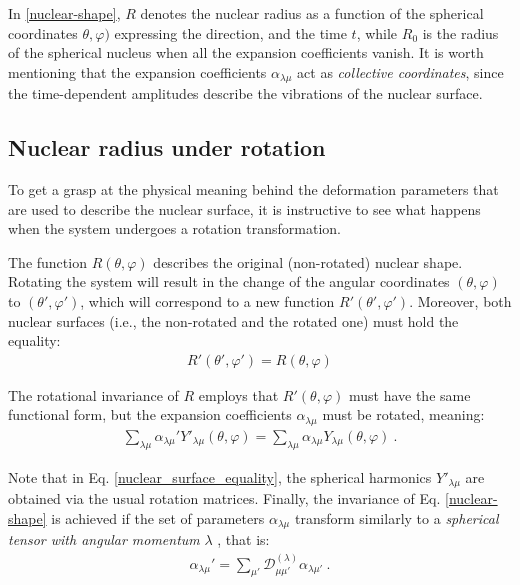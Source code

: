 In \ref{nuclear-shape}, $R$ denotes the nuclear radius as a function of the spherical coordinates $\theta,\varphi)$ expressing the direction, and the time $t$, while $R_0$ is the radius of the spherical nucleus when all the expansion coefficients vanish. It is worth mentioning that the expansion coefficients $\alpha_{\lambda\mu}$ act as \emph{collective coordinates}, since the time-dependent amplitudes describe the vibrations of the nuclear surface.

\subsection{Nuclear radius under rotation}

To get a grasp at the physical meaning behind the deformation parameters that are used to describe the nuclear surface, it is instructive to see what happens when the system undergoes a rotation transformation.

The function $R(\theta,\varphi)$ describes the original (non-rotated) nuclear shape. Rotating the system will result in the change of the angular coordinates $(\theta,\varphi)$ to $(\theta',\varphi')$, which will correspond to a new function $R'(\theta',\varphi')$. Moreover, both nuclear surfaces (i.e., the non-rotated and the rotated one) must hold the equality:
\begin{align}
    R'(\theta',\varphi')=R(\theta,\varphi)
\end{align}

The rotational invariance of $R$ employs that $R'(\theta,\varphi)$ must have the same functional form, but the expansion coefficients $\alpha_{\lambda\mu}$ must be rotated, meaning:
\begin{align}
    \sum_{\lambda\mu}\alpha_{\lambda\mu}'Y'_{\lambda\mu}(
        \theta,\varphi)=\sum_{\lambda\mu}\alpha_{\lambda\mu}Y_{\lambda\mu}(
            \theta,\varphi)\ . \label{nuclear_surface_equality}
\end{align}

Note that in Eq. \ref{nuclear_surface_equality}, the spherical harmonics $Y'_{\lambda\mu}$ are obtained via the usual rotation matrices. Finally, the invariance of Eq. \ref{nuclear-shape} is achieved if the set of parameters $\alpha_{\lambda\mu}$ transform similarly to a \emph{spherical tensor with angular momentum} $\lambda$ \cite{ring2004nuclear}, that is:
\begin{align}
    \alpha_{\lambda\mu}'=\sum_{\mu'}\mathcal{D}^{(\lambda)}_{\mu\mu'}\alpha_{\lambda\mu'}\ .
\end{align}

